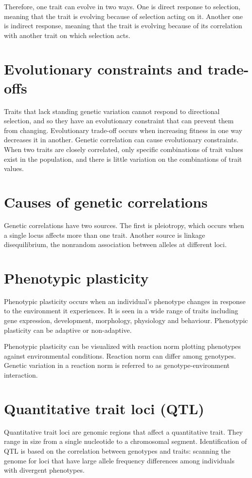 \documentclass[11pt]{article}
\begin{document}
\begin{sloppypar}
\par

Therefore, one trait can evolve in two ways. 
One is direct response to selection, meaning that the trait is evolving because of selection acting on it. 
Another one is indirect response, meaning that the trait is evolving because of its correlation with another trait on which selection acts. 

\section{Evolutionary constraints and trade-offs}
Traits that lack standing genetic variation cannot respond to directional selection, and so they have an evolutionary constraint that can prevent them from changing. 
Evolutionary trade-off occurs when increasing fitness in one way decreases it in another. 
Genetic correlation can cause evolutionary constraints. 
When two traits are closely correlated, only specific combinations of trait values exist in the population, and there is little variation on the combinations of trait values. 

\section{Causes of genetic correlations}
Genetic correlations have two sources. 
The first is pleiotropy, which occurs when a single locus affects more than one trait. 
Another source is linkage disequilibrium, the nonrandom association between alleles at different loci. 

\section{Phenotypic plasticity}
Phenotypic plasticity occurs when an individual's phenotype changes in response to the environment it experiences. 
It is seen in a wide range of traits including gene expression, development, morphology, physiology and behaviour. 
Phenotypic plasticity can be adaptive or non-adaptive. 

\par

Phenotypic plasticity can be visualized with reaction norm plotting phenotypes against environmental conditions. 
Reaction norm can differ among genotypes. 
Genetic variation in a reaction norm is referred to as genotype-environment interaction. 

\section{Quantitative trait loci (QTL)}
Quantitative trait loci are genomic regions that affect a quantitative trait. 
They range in size from a single nucleotide to a chromosomal segment. 
Identification of QTL is based on the correlation between genotypes and traits: scanning the genome for loci that have large allele frequency differences among individuals with divergent phenotypes. 


\end{sloppypar}
\end{document}
